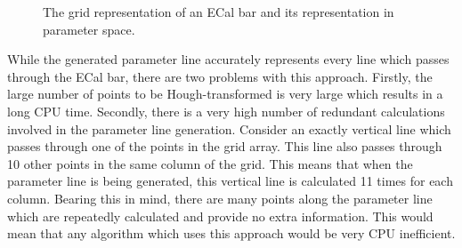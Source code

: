 \begin{figure}%
  \centering
  \caption{The grid representation of an ECal bar and its representation in parameter space.}
  \label{fig:ECalBarGridRepresentationAndHoughTransform}
\end{figure}
\newline
\newline
While the generated parameter line accurately represents every line which passes through the ECal bar, there are two problems with this approach.  Firstly, the large number of points to be Hough-transformed is very large which results in a long CPU time.  Secondly, there is a very high number of redundant calculations involved in the parameter line generation.  Consider an exactly vertical line which passes through one of the points in the grid array.  This line also passes through 10 other points in the same column of the grid.  This means that when the parameter line is being generated, this vertical line is calculated 11 times for each column.  Bearing this in mind, there are many points along the parameter line which are repeatedly calculated and provide no extra information.  This would mean that any algorithm which uses this approach would be very CPU inefficient.
\newline
\newline
